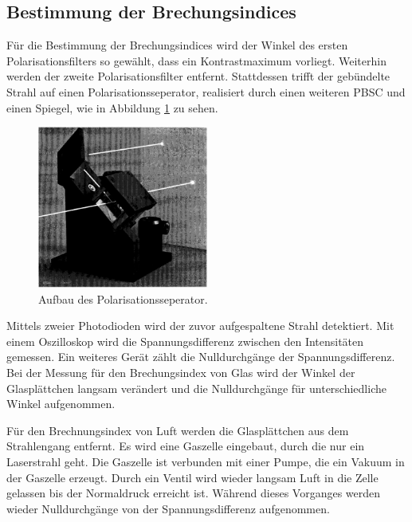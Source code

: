 \subsection{Bestimmung der Brechungsindices}
Für die Bestimmung der Brechungsindices wird der
Winkel des ersten Polarisationsfilters so gewählt, dass ein Kontrastmaximum vorliegt.
Weiterhin werden der zweite Polarisationsfilter entfernt.
Stattdessen trifft der gebündelte Strahl auf einen Polarisationsseperator, realisiert durch einen
weiteren PBSC und einen Spiegel, wie in Abbildung \ref{fig:polsep} zu sehen.
\begin{figure}
     \centering
     \includegraphics[width=0.5\textwidth]{PSBC.PNG}
     \caption{Aufbau des Polarisationsseperator.\cite{skript}}
     \label{fig:polsep}
\end{figure}
\FloatBarrier
Mittels zweier Photodioden wird der zuvor aufgespaltene Strahl detektiert.
Mit einem Oszilloskop wird die Spannungsdifferenz zwischen den Intensitäten
gemessen. Ein weiteres Gerät zählt die Nulldurchgänge der Spannungsdifferenz.
Bei der Messung für den Brechungsindex von Glas wird
der Winkel der Glasplättchen langsam verändert und die Nulldurchgänge für unterschiedliche
Winkel aufgenommen.

Für den Brechnungsindex von Luft werden die Glasplättchen
aus dem Strahlengang entfernt. Es wird eine Gaszelle eingebaut, durch
die nur ein Laserstrahl geht. Die Gaszelle ist verbunden mit einer Pumpe,
die ein Vakuum in der Gaszelle erzeugt. Durch ein Ventil wird wieder langsam
Luft in die Zelle gelassen bis der Normaldruck erreicht ist. Während
dieses Vorganges werden wieder Nulldurchgänge von der Spannungsdifferenz aufgenommen.
